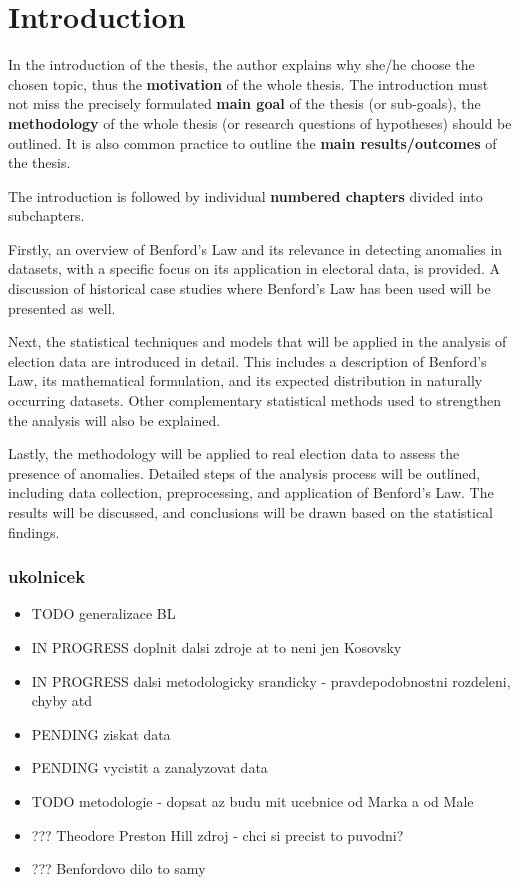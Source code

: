 \chapter*{Introduction}


\begin{koment}
In the introduction of the thesis, the author explains why she/he choose the 
chosen topic, thus the \textbf{motivation} of the whole thesis. The introduction must not 
miss the precisely formulated \textbf{main goal} of the thesis (or sub-goals), the 
\textbf{methodology} of the whole thesis (or research questions of hypotheses) should be 
outlined. It is also common practice to outline the \textbf{main results/outcomes} of the 
thesis.

The introduction is followed by individual \textbf{numbered chapters} divided into 
subchapters.



Firstly, an overview of Benford’s Law and its relevance in detecting anomalies in datasets, with a specific focus on its application in electoral data, is provided. A discussion of historical case studies where Benford’s Law has been used will be presented as well.

Next, the statistical techniques and models that will be applied in the analysis of election data are introduced in detail. This includes a description of Benford's Law, its mathematical formulation, and its expected distribution in naturally occurring datasets. Other complementary statistical methods used to strengthen the analysis will also be explained.

Lastly, the methodology will be applied to real election data to assess the presence of anomalies. Detailed steps of the analysis process will be outlined, including data collection, preprocessing, and application of Benford's Law. The results will be discussed, and conclusions will be drawn based on the statistical findings.
\end{koment}




\subsection*{ukolnicek}

\begin{itemize}
    \item TODO generalizace BL 
    \item IN PROGRESS doplnit dalsi zdroje at to neni jen Kosovsky 
    \item IN PROGRESS dalsi metodologicky srandicky - pravdepodobnostni rozdeleni, chyby atd 
    \item PENDING ziskat data 
    \item PENDING vycistit a zanalyzovat data 
    \item TODO metodologie - dopsat az budu mit ucebnice od Marka a od Male 
    \item ??? Theodore Preston Hill zdroj - chci si precist to puvodni? 
    \item ??? Benfordovo dilo to samy 
\end{itemize}

